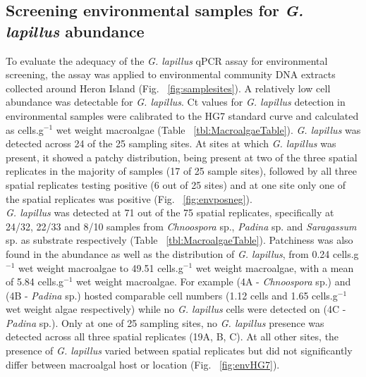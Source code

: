 \documentclass[12pt]{article}
\begin{document}
\subsection*{Screening environmental samples for \emph{G. lapillus} abundance }%
\FloatBarrier
To evaluate the adequacy of the \emph{G. lapillus} %
qPCR assay for environmental screening, the assay was applied to environmental community DNA extracts collected around Heron Island (Fig. ~\ref{fig:samplesites}). 
A relatively low cell abundance was detectable for \emph{G. lapillus}. 
Ct values for \emph{G. lapillus} detection in environmental samples were calibrated to the HG7 standard curve and calculated as cells.g$^{-1}$ wet weight macroalgae (Table ~\ref{tbl:MacroalgaeTable}).  
\emph{G. lapillus} was detected across 24 of the 25 sampling sites. 
At sites at which \textit{G. lapillus} was present, it showed a patchy distribution, being present at two of the three spatial replicates in the majority of samples (17 of 25 sample sites), followed by all three spatial replicates testing positive (6 out of 25 sites) and at one site only one of the spatial replicates was positive (Fig. ~\ref{fig:envposneg}). \\
\emph{G. lapillus} was detected at 71 out of the 75 spatial replicates, specifically at 24/32, 22/33 and 8/10 samples from \emph{Chnoospora} sp., \emph{Padina} sp. and \emph{Saragassum} sp. as substrate respectively (Table ~\ref{tbl:MacroalgaeTable}).
Patchiness was also found in the abundance as well as the distribution of \emph{G. lapillus}, from 0.24 cells.g$^{-1}$ wet weight macroalgae to 49.51 cells.g$^{-1}$ wet weight macroalgae, with a mean of 5.84 cells.g$^{-1}$ wet weight macroalgae. 
For example (4A - \emph{Chnoospora} sp.) and (4B - \emph{Padina} sp.) hosted comparable cell numbers (1.12 cells and 1.65 cells.g$^{-1}$ wet weight algae respectively) while no \emph{G. lapillus} cells were detected on (4C - \emph{Padina} sp.).
Only at one of 25 sampling sites, no \emph{G. lapillus} presence was detected across all three spatial replicates (19A, B, C).
At all other sites, the presence of \textit{G. lapillus} varied between spatial replicates but did not significantly differ between macroalgal host or location (Fig. ~\ref{fig:envHG7}). 
\end{document}
